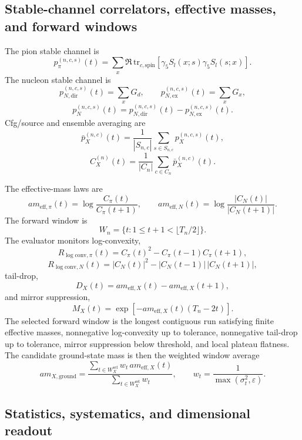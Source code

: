 \documentclass[11pt]{article}
\begin{document}
\subsection{Stable-channel correlators, effective masses, and forward windows}

The pion stable channel is
\[
p_\pi^{(n,c,s)}(t)
=
\sum_x \Re\,\mathrm{tr}_{c,\mathrm{spin}}
\left[
\gamma_5 S_l(x;s)\gamma_5 S_l(s;x)
\right].
\]
The nucleon stable channel is
\[
p_{N,\mathrm{dir}}^{(n,c,s)}(t) = \sum_x G_d,
\qquad
p_{N,\mathrm{ex}}^{(n,c,s)}(t) = \sum_x G_x,
\]
\[
p_N^{(n,c,s)}(t)
=
p_{N,\mathrm{dir}}^{(n,c,s)}(t) - p_{N,\mathrm{ex}}^{(n,c,s)}(t).
\]
Cfg/source and ensemble averaging are
\[
\bar p_X^{(n,c)}(t)
=
\frac{1}{|S_{n,c}|}\sum_{s\in S_{n,c}} p_X^{(n,c,s)}(t),
\]
\[
C_X^{(n)}(t)
=
\frac{1}{|C_n|}\sum_{c\in C_n} \bar p_X^{(n,c)}(t).
\]

The effective-mass laws are
\[
a m_{\mathrm{eff},\pi}(t)
=
\log\!\frac{C_\pi(t)}{C_\pi(t+1)},
\qquad
a m_{\mathrm{eff},N}(t)
=
\log\!\frac{|C_N(t)|}{|C_N(t+1)|}.
\]
The forward window is
\[
W_n = \{ t : 1 \le t+1 < \lfloor T_n/2 \rfloor \}.
\]
The evaluator monitors log-convexity,
\[
R_{\log\mathrm{conv},\pi}(t)
=
C_\pi(t)^2 - C_\pi(t-1)C_\pi(t+1),
\]
\[
R_{\log\mathrm{conv},N}(t)
=
|C_N(t)|^2 - |C_N(t-1)|\,|C_N(t+1)|,
\]
tail-drop,
\[
D_X(t)
=
a m_{\mathrm{eff},X}(t) - a m_{\mathrm{eff},X}(t+1),
\]
and mirror suppression,
\[
M_X(t)
=
\exp[-a m_{\mathrm{eff},X}(t)(T_n - 2t)].
\]
The selected forward window is the longest contiguous run satisfying finite effective masses,
nonnegative log-convexity up to tolerance, nonnegative tail-drop up to tolerance, mirror
suppression below threshold, and local plateau flatness. The candidate ground-state mass is then
the weighted window average
\[
a m_{X,\mathrm{ground}}
=
\frac{\sum_{t\in W_X^{\mathrm{sel}}} w_t\,a m_{\mathrm{eff},X}(t)}
{\sum_{t\in W_X^{\mathrm{sel}}} w_t},
\qquad
w_t = \frac{1}{\max(\sigma_t^2,\varepsilon)}.
\]

\subsection{Statistics, systematics, and dimensional readout}
\end{document}
